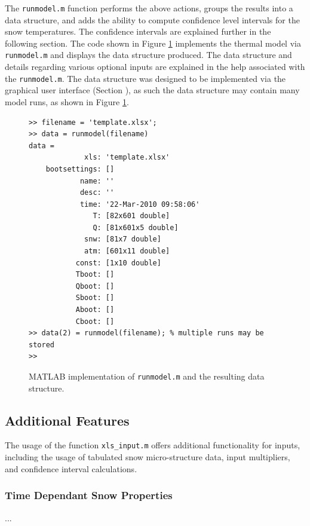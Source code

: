 The \texttt{runmodel.m} function performs the above actions, groups the results into a data structure, and adds the ability to compute confidence level intervals for the snow temperatures.  The confidence intervals are explained further in the following section.  The code shown in Figure \ref{TM:fig:runmodel} implements the thermal model via \texttt{runmodel.m} and displays the data structure produced.  The data structure and details regarding various optional inputs are explained in the help associated with the \texttt{runmodel.m}.  The data structure was designed to be implemented via the graphical user interface (Section ), as such the data structure may contain many model runs, as shown in Figure \ref{TM:fig:runmodel}.

\begin{figure}[ht!]
\begin{singlespaced}\begin{lstlisting}[style=figure]
>> filename = 'template.xlsx';
>> data = runmodel(filename)
data = 
             xls: 'template.xlsx'
    bootsettings: []
            name: ''
            desc: ''
            time: '22-Mar-2010 09:58:06'
               T: [82x601 double]
               Q: [81x601x5 double]
             snw: [81x7 double]
             atm: [601x11 double]
           const: [1x10 double]
           Tboot: []
           Qboot: []
           Sboot: []
           Aboot: []
           Cboot: []
>> data(2) = runmodel(filename); % multiple runs may be stored
>> 
\end{lstlisting}\end{singlespaced}
\caption{MATLAB implementation of \texttt{runmodel.m} and the resulting data structure.}
\label{TM:fig:runmodel}
\end{figure}

\subsection{Additional Features}\label{TM:sec:features}
The usage of the function \texttt{xls\_input.m} offers additional functionality for inputs, including the usage of tabulated snow micro-structure data, input multipliers, and confidence interval calculations.

\subsubsection{Time Dependant Snow Properties}
...

